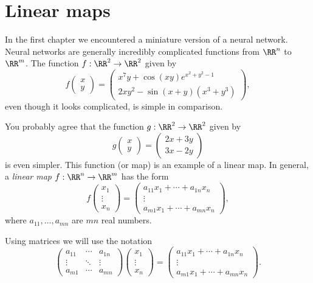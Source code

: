 \documentclass{article}
\begin{document}
\section{Linear maps}\label{sectionLM}

In the first chapter we encountered a miniature version of a neural
network. Neural networks are generally incredibly complicated functions
from $\RR^n$ to $\RR^m$. The function $f:\RR^2\rightarrow \RR^2$
given by
$$
f\begin{pmatrix}
  x \\ y
\end{pmatrix} =
\begin{pmatrix}
  x^7 y + \cos(x y) e^{x^2 + y^2 -1}\\
  2 x y^2 - \sin(x + y) (x^3 + y^3)
\end{pmatrix},
$$
even though it looks complicated, is simple in comparison.

You probably agree that the function $g:\RR^2\rightarrow \RR^2$ given by
$$
g\begin{pmatrix}
  x \\ y
\end{pmatrix} =
\begin{pmatrix}
  2 x + 3 y\\
  3 x - 2 y
\end{pmatrix}
$$
is even simpler. This function (or map) is an example of a linear map.
In general, a \emph{linear map}
$f: \RR^n\rightarrow \RR^m$ has the form
$$
f\begin{pmatrix}
  x_1 \\ \vdots \\ x_n
\end{pmatrix} =
\begin{pmatrix}
  a_{11} x_1 + \cdots + a_{1 n} x_n\\
  \vdots \\
  a_{m1} x_1 + \cdots + a_{m n} x_n
\end{pmatrix},
$$
where $a_{11}, \dots, a_{mn}$ are $m n$ real numbers.

Using matrices we will use the notation
$$
\begin{pmatrix}
a_{11} & \cdots & a_{1n}\\
\vdots & \ddots & \vdots\\
a_{m1} & \cdots & a_{mn}
\end{pmatrix}
\begin{pmatrix} x_1 \\ \vdots \\ x_n\end{pmatrix} =
\begin{pmatrix}
  a_{11} x_1 + \cdots + a_{1 n} x_n\\
  \vdots \\
  a_{m1} x_1 + \cdots + a_{m n} x_n
\end{pmatrix}.
$$
\end{document}
